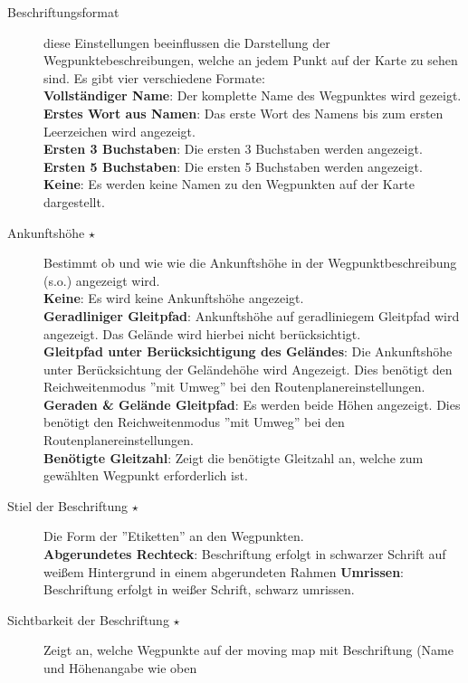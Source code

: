 \begin{description}
\item[Beschriftungsformat]  diese Einstellungen beeinflussen die Darstellung der Wegpunktebeschreibungen,
  welche an jedem Punkt auf der Karte zu sehen sind.\label{conf:labels}
  Es gibt vier verschiedene Formate:\\
  {\bf Vollständiger Name}: Der komplette Name des Wegpunktes wird gezeigt. \\
  {\bf Erstes Wort aus Namen}: Das erste Wort des Namens bis zum ersten Leerzeichen wird angezeigt.
    \\
  {\bf Ersten 3 Buchstaben}: Die ersten 3 Buchstaben werden angezeigt. \\
  {\bf Ersten 5 Buchstaben}: Die ersten 5 Buchstaben werden angezeigt. \\
  {\bf Keine}: Es werden keine Namen zu den Wegpunkten auf der Karte dargestellt.
\item[Ankunftshöhe $\star$] Bestimmt ob und wie wie die Ankunftshöhe  in der Wegpunktbeschreibung (s.o.) angezeigt wird. \\
  {\bf Keine}: Es wird keine Ankunftshöhe angezeigt. \\
  {\bf Geradliniger Gleitpfad}: Ankunftshöhe auf geradliniegem Gleitpfad wird angezeigt. Das Gelände wird hierbei  nicht berücksichtigt. \\
  {\bf Gleitpfad unter Berücksichtigung des Geländes}: Die Ankunftshöhe unter Berücksichtung der Geländehöhe wird Angezeigt.
  \achtung Dies benötigt den Reichweitenmodus ''mit Umweg'' bei den Routenplanereinstellungen. \\
  {\bf Geraden \& Gelände Gleitpfad}: Es werden beide Höhen angezeigt. Dies benötigt den Reichweitenmodus ''mit Umweg'' bei den Routenplanereinstellungen.  \\
  {\bf Benötigte Gleitzahl}: Zeigt die benötigte Gleitzahl an, welche zum gewählten Wegpunkt  erforderlich ist.
\item[Stiel der Beschriftung $\star$]  Die Form der ''Etiketten'' an den Wegpunkten.\\
    {\bf Abgerundetes Rechteck}: Beschriftung erfolgt in schwarzer Schrift auf weißem Hintergrund in einem abgerundeten Rahmen
    {\bf Umrissen}: Beschriftung erfolgt in weißer Schrift, schwarz umrissen.
\item[Sichtbarkeit der Beschriftung $\star$]  \label{conf:labelvisibility}
   Zeigt an, welche Wegpunkte auf der moving map mit Beschriftung (Name und Höhenangabe wie oben

\end{description}
